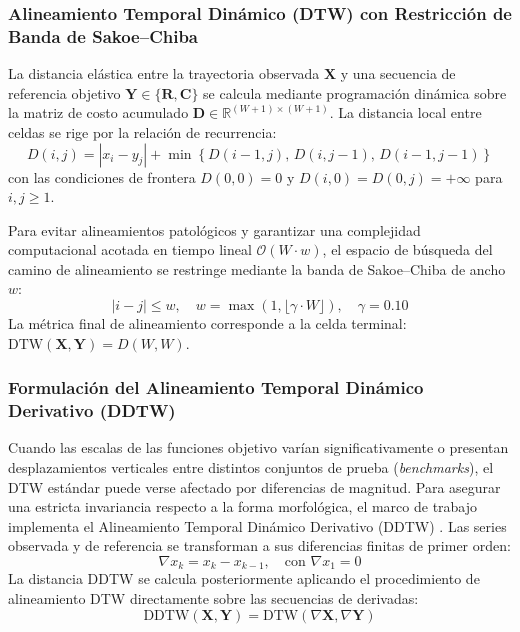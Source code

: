\subsubsection{Alineamiento Temporal Dinámico (DTW) con Restricción de Banda de Sakoe--Chiba}

La distancia elástica entre la trayectoria observada $\mathbf{X}$ y una secuencia de referencia objetivo $\mathbf{Y} \in \{\mathbf{R}, \mathbf{C}\}$ se calcula mediante programación dinámica sobre la matriz de costo acumulado $\mathbf{D} \in \mathbb{R}^{(W+1) \times (W+1)}$. La distancia local entre celdas se rige por la relación de recurrencia:
\begin{equation}
D(i, j) = |x_i - y_j| + \min \left\{ D(i-1, j),\, D(i, j-1),\, D(i-1, j-1) \right\}
\label{eq:dtw_recurrence}
\end{equation}
con las condiciones de frontera $D(0, 0) = 0$ y $D(i, 0) = D(0, j) = +\infty$ para $i, j \ge 1$.

Para evitar alineamientos patológicos y garantizar una complejidad computacional acotada en tiempo lineal $\mathcal{O}(W \cdot w)$, el espacio de búsqueda del camino de alineamiento se restringe mediante la banda de Sakoe--Chiba de ancho $w$:
\begin{equation}
|i - j| \le w, \quad w = \max(1, \lfloor \gamma \cdot W \rfloor), \quad \gamma = 0.10
\label{eq:sakoe_chiba}
\end{equation}
La métrica final de alineamiento corresponde a la celda terminal: $\text{DTW}(\mathbf{X}, \mathbf{Y}) = D(W, W)$.

\subsubsection{Formulación del Alineamiento Temporal Dinámico Derivativo (DDTW)}

Cuando las escalas de las funciones objetivo varían significativamente o presentan desplazamientos verticales entre distintos conjuntos de prueba (\textit{benchmarks}), el DTW estándar puede verse afectado por diferencias de magnitud. Para asegurar una estricta invariancia respecto a la forma morfológica, el marco de trabajo implementa el Alineamiento Temporal Dinámico Derivativo (DDTW) \cite{keogh2001derivative}. Las series observada y de referencia se transforman a sus diferencias finitas de primer orden:
\begin{equation}
\nabla x_k = x_k - x_{k-1}, \quad \text{con } \nabla x_1 = 0
\label{eq:derivative_transform}
\end{equation}
La distancia DDTW se calcula posteriormente aplicando el procedimiento de alineamiento DTW directamente sobre las secuencias de derivadas:
\begin{equation}
\text{DDTW}(\mathbf{X}, \mathbf{Y}) = \text{DTW}(\nabla \mathbf{X}, \nabla \mathbf{Y})
\label{eq:ddtw_metric}
\end{equation}

